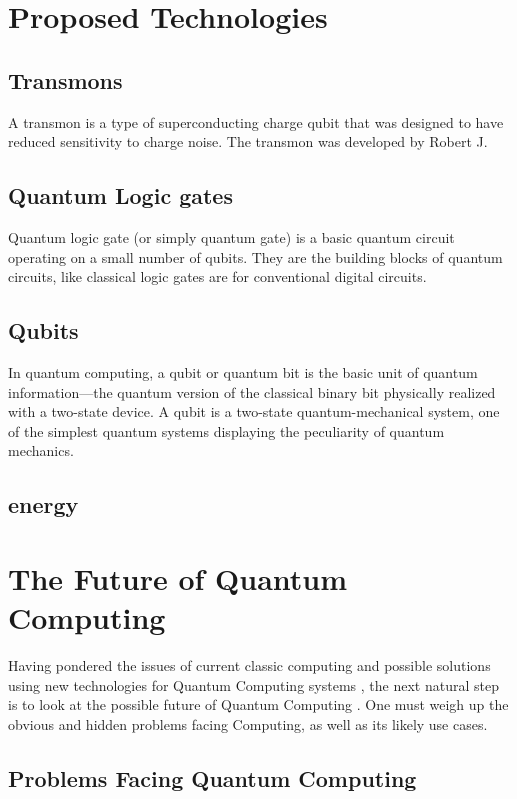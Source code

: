 \documentclass[journal]{IEEEtran}
\begin{document}
\section{Proposed Technologies}


\subsection{Transmons}
A transmon is a type of superconducting charge qubit that was designed to have reduced sensitivity to charge noise. The transmon was developed by Robert J.

\subsection{ Quantum Logic gates}\label{subsec:  Quantum logicgates}
Quantum logic gate (or simply quantum gate) is a basic quantum circuit operating on a small number of qubits. They are the building blocks of quantum circuits, like classical logic gates are for conventional digital circuits.

\subsection{Qubits}
In quantum computing, a qubit or quantum bit is the basic unit of quantum information—the quantum version of the classical binary bit physically realized with a two-state device. A qubit is a two-state quantum-mechanical system, one of the simplest quantum systems displaying the peculiarity of quantum mechanics.

\subsection{energy}\label{subsec:energy}



\section{The Future of Quantum Computing }


Having pondered the issues of current classic computing  and possible solutions using new technologies for Quantum Computing systems , the next natural step is to look at the possible future of Quantum Computing . One must weigh up the obvious and hidden problems facing Computing, as well as its likely use cases.


\subsection{Problems Facing Quantum Computing }
\end{document}
